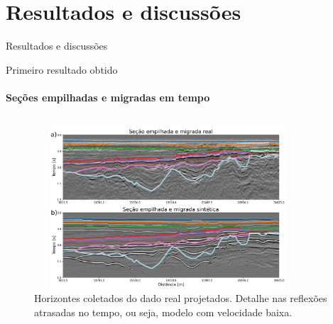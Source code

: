 \documentclass[xcolor=dvipsnames,t]{beamer}
\begin{document}
\section{Resultados e discussões}
\begin{frame}{}
	\bigskip\bigskip\bigskip\bigskip\bigskip\bigskip
	\begin{center}
		\Huge Resultados e discussões
	\end{center}    
\end{frame}
\begin{frame}{Primeiro resultado obtido}
\framesubtitle{Seções empilhadas e migradas em tempo}	
	
	\begin{columns}[onlytextwidth, T]
		\begin{column}{.9\textwidth}
			\begin{figure}[h]
				\includegraphics[width=10cm,height=6cm]{../imagens/comparisionHRZ.png}	
				\tiny{\caption{Horizontes coletados do dado real projetados. Detalhe nas reflexões atrasadas no tempo, ou seja, modelo com velocidade baixa.}} 	
			\end{figure}			
		\end{column}
	\end{columns}	
	
\end{frame}
\end{document}
